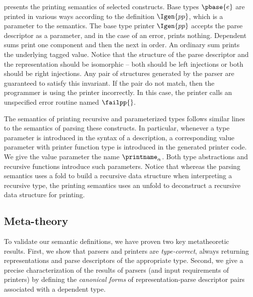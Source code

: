  presents the printing semantics of
selected \ddc{} constructs.  Base types $\pbase{e}$ are printed in
various ways according to the definition
$\Igen{pp}$, which is a parameter to the semantics.  The base type
printer $\Igen{pp}$ accepts the parse descriptor as a parameter, and
in the case of an error, prints nothing.
Dependent sums print one component and then the next in order.
An ordinary sum prints the underlying tagged value.
Notice that the structure of the parse descriptor
and the representation should be isomorphic -- both should be
left injections or both should be right injections.  Any pair
of structures generated by the parser are guaranteed to satisfy this invariant.
If the pair do not match, then the
programmer is using the printer incorrectly.  In this case,
the printer calls an unspecified error routine named $\failpp{}$.

The semantics of printing recursive and parameterized types follows
similar lines to the semantics of parsing these constructs.
In particular, whenever a type parameter is introduced in the syntax
of a description, a corresponding value parameter with printer function type 
is introduced in the generated printer code. We give the value parameter
the name $\printname_\alpha$.  Both type abstractions and recursive functions
introduce such parameters.  Notice that whereas the parsing semantics
uses a fold to build a recursive data structure
when interpreting a recursive type, the printing semantics uses an
unfold to deconstruct a recursive data structure for printing.  

\subsection{Meta-theory}
\label{sec:meta-theory}
To validate our semantic definitions,
we have proven two key metatheoretic results.  First, we show that
parsers and printers are {\em type-correct}, always returning representations
and parse descriptors of the appropriate type.  Second, we give a precise
characterization of the results of parsers
(and input requirements of printers) by defining the {\em canonical forms}
of representation-parse descriptor pairs associated with a
dependent \ddc{} type.


